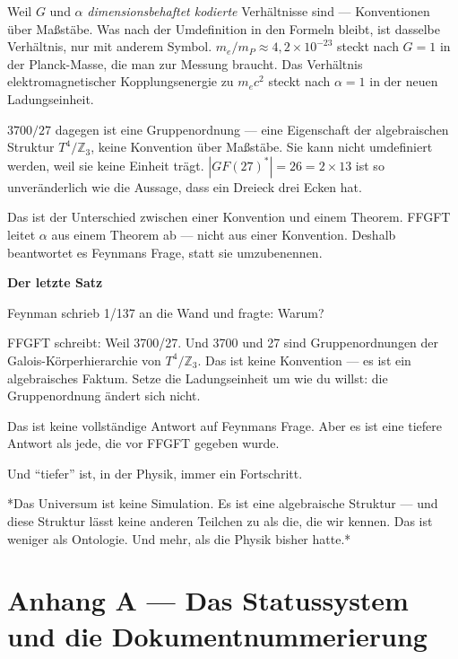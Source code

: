 \documentclass[11pt,oneside]{book}
\begin{document}
Weil $G$ und $\alpha$ \textit{dimensionsbehaftet kodierte} Verhältnisse
sind — Konventionen über Maßstäbe. Was nach der Umdefinition in den
Formeln bleibt, ist dasselbe Verhältnis, nur mit anderem Symbol.
$m_e/m_P \approx 4{,}2\times10^{-23}$ steckt nach $G=1$ in der
Planck-Masse, die man zur Messung braucht. Das Verhältnis
elektromagnetischer Kopplungsenergie zu $m_e c^2$ steckt nach
$\alpha=1$ in der neuen Ladungseinheit.

$3700/27$ dagegen ist eine Gruppenordnung — eine Eigenschaft der
algebraischen Struktur $T^4/\mathbb{Z}_3$, keine Konvention über
Maßstäbe. Sie kann nicht umdefiniert werden, weil sie keine Einheit
trägt. $|GF(27)^*| = 26 = 2\times13$ ist so unveränderlich wie die
Aussage, dass ein Dreieck drei Ecken hat.

Das ist der Unterschied zwischen einer Konvention und einem Theorem.
FFGFT leitet $\alpha$ aus einem Theorem ab — nicht aus einer Konvention.
Deshalb beantwortet es Feynmans Frage, statt sie umzubenennen.


\textbf{Der letzte Satz}


Feynman schrieb 1/137 an die Wand und fragte: Warum?


FFGFT schreibt: Weil 3700/27. Und 3700 und 27 sind Gruppenordnungen
der Galois-Körperhierarchie von $T^4/\mathbb{Z}_3$. Das ist keine
Konvention — es ist ein algebraisches Faktum. Setze die Ladungseinheit
um wie du willst: die Gruppenordnung ändert sich nicht.


Das ist keine vollständige Antwort auf Feynmans Frage. Aber es ist eine
tiefere Antwort als jede, die vor FFGFT gegeben wurde.


Und \enquote{tiefer} ist, in der Physik, immer ein Fortschritt.




*Das Universum ist keine Simulation. Es ist eine algebraische Struktur —
und diese Struktur lässt keine anderen Teilchen zu als die, die wir kennen.
Das ist weniger als Ontologie. Und mehr, als die Physik bisher hatte.*












\chapter*{Anhang A — Das Statussystem und die Dokumentnummerierung}
\end{document}
